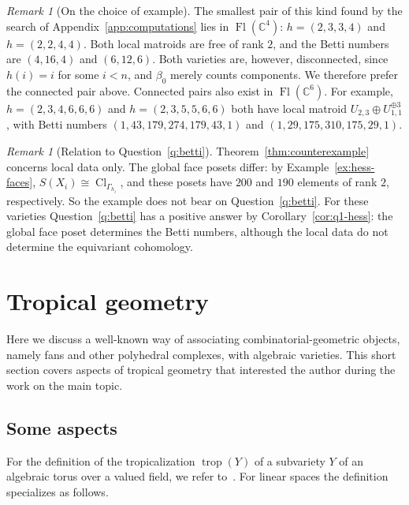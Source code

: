 \documentclass[11pt,a4paper]{article}
\numberwithin{equation}{section}
\theoremstyle{plain}
\theoremstyle{definition}
\theoremstyle{remark}
\newtheorem{remark}[theorem]{Remark}
\newcommand{\C}{\mathbb{C}}
\DeclareMathOperator{\Fl}{Fl}
\DeclareMathOperator{\Cl}{Cl}
\DeclareMathOperator{\trop}{trop}
\begin{document}
\begin{remark}[On the choice of example]
The smallest pair of this kind found by the search of Appendix~\ref{app:computations} lies in $\Fl(\C^4)$: $h=(2,3,3,4)$ and $h=(2,2,4,4)$. Both local matroids are free of rank $2$, and the Betti numbers are $(4,16,4)$ and $(6,12,6)$. Both varieties are, however, disconnected, since $h(i)=i$ for some $i<n$, and $\beta_0$ merely counts components. We therefore prefer the connected pair above. Connected pairs also exist in $\Fl(\C^6)$. For example, $h=(2,3,4,6,6,6)$ and $h=(2,3,5,5,6,6)$ both have local matroid $U_{2,3}\oplus U_{1,1}^{\oplus3}$, with Betti numbers $(1,43,179,274,179,43,1)$ and $(1,29,175,310,175,29,1)$.
\end{remark}

\begin{remark}[Relation to Question~\ref{q:betti}]
Theorem~\ref{thm:counterexample} concerns local data only. The global face posets differ: by Example~\ref{ex:hess-faces}, $S(X_i)\cong\Cl_{\Gamma_{h_i}}$, and these posets have $200$ and $190$ elements of rank $2$, respectively. So the example does not bear on Question~\ref{q:betti}. For these varieties Question~\ref{q:betti} has a positive answer by Corollary~\ref{cor:q1-hess}: the global face poset determines the Betti numbers, although the local data do not determine the equivariant cohomology.
\end{remark}

\section{Tropical geometry}\label{sec:tropical}

Here we discuss a well-known way of associating combinatorial-geometric objects, namely fans and other polyhedral complexes, with algebraic varieties. This short section covers aspects of tropical geometry that interested the author during the work on the main topic.

\subsection{Some aspects}

For the definition of the tropicalization $\trop(Y)$ of a subvariety $Y$ of an algebraic torus over a valued field, we refer to~\cite{MS15}. For linear spaces the definition specializes as follows.
\end{document}
